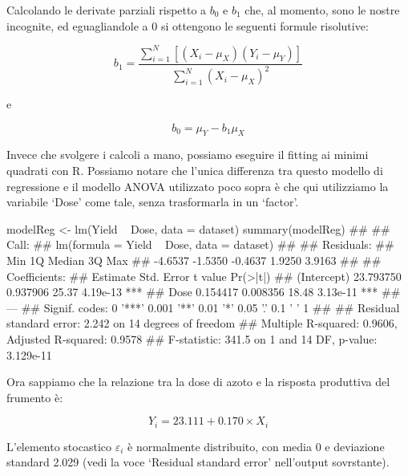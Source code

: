 \documentclass[a4paper,12pt,oneside]{book}
\newenvironment{Shaded}{}{}
\newcommand{\KeywordTok}[1]{#1}
\newcommand{\DataTypeTok}[1]{#1}
\newcommand{\StringTok}[1]{#1}
\newcommand{\CommentTok}[1]{#1}
\newcommand{\OperatorTok}[1]{#1}
\newcommand{\NormalTok}[1]{#1}
\begin{document}
Calcolando le derivate parziali rispetto a \(b_0\) e \(b_1\) che, al momento, sono le nostre incognite, ed eguagliandole a 0 si ottengono le seguenti formule risolutive:

\[{b_1} = \frac{{\sum\limits_{i = 1}^N {\left[ {\left( {{X_i} - {\mu _X}} \right)\left( {{Y_i} - {\mu _Y}} \right)} \right]} }}{{\sum\limits_{i = 1}^N {{{\left( {{X_i} - {\mu _X}} \right)}^2}} }}\]

e

\[{b_0} = {\mu _Y} - {b_1}{\mu _X}\]

Invece che svolgere i calcoli a mano, possiamo eseguire il fitting ai minimi quadrati con R. Possiamo notare che l'unica differenza tra questo modello di regressione e il modello ANOVA utilizzato poco sopra è che qui utilizziamo la variabile `Dose' come tale, senza trasformarla in un `factor'.

\begin{Shaded}
\begin{Highlighting}[]
\NormalTok{modelReg <-}\StringTok{ }\KeywordTok{lm}\NormalTok{(Yield }\OperatorTok{~}\StringTok{ }\NormalTok{Dose, }\DataTypeTok{data =}\NormalTok{ dataset)}
\KeywordTok{summary}\NormalTok{(modelReg)}
\CommentTok{## }
\CommentTok{## Call:}
\CommentTok{## lm(formula = Yield ~ Dose, data = dataset)}
\CommentTok{## }
\CommentTok{## Residuals:}
\CommentTok{##     Min      1Q  Median      3Q     Max }
\CommentTok{## -4.6537 -1.5350 -0.4637  1.9250  3.9163 }
\CommentTok{## }
\CommentTok{## Coefficients:}
\CommentTok{##              Estimate Std. Error t value Pr(>|t|)    }
\CommentTok{## (Intercept) 23.793750   0.937906   25.37 4.19e-13 ***}
\CommentTok{## Dose         0.154417   0.008356   18.48 3.13e-11 ***}
\CommentTok{## ---}
\CommentTok{## Signif. codes:  0 '***' 0.001 '**' 0.01 '*' 0.05 '.' 0.1 ' ' 1}
\CommentTok{## }
\CommentTok{## Residual standard error: 2.242 on 14 degrees of freedom}
\CommentTok{## Multiple R-squared:  0.9606, Adjusted R-squared:  0.9578 }
\CommentTok{## F-statistic: 341.5 on 1 and 14 DF,  p-value: 3.129e-11}
\end{Highlighting}
\end{Shaded}

Ora sappiamo che la relazione tra la dose di azoto e la risposta produttiva del frumento è:

\[ Y_i = 23.111 + 0.170 \times X_i \]

L'elemento stocastico \(\varepsilon_i\) è normalmente distribuito, con media 0 e deviazione standard 2.029 (vedi la voce `Residual standard error' nell'output sovrstante).
\end{document}
